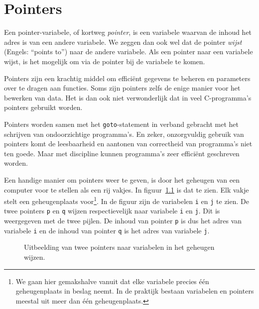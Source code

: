 \chapter{Pointers}
\label{cha:pointers}
\thispagestyle{empty}

Een pointer-variabele, of kortweg \textsl{pointer}, is een variabele waarvan de inhoud het adres is van een andere variabele. We zeggen dan ook wel dat de pointer \textsl{wijst} (Engels: ``points to'') naar de andere variabele. Als een pointer naar een variabele wijst, is het mogelijk om via de pointer bij de variabele te komen.

Pointers zijn een krachtig middel om efficiënt gegevens te beheren en parameters over te dragen aan functies. Soms zijn pointers zelfs de enige manier voor het bewerken van data. Het is dan ook niet verwonderlijk dat in veel C-programma's pointers gebruikt worden. 

Pointers worden samen met het \texttt{goto}-statement in verband gebracht met het schrijven van ondoorzichtige programma's. En zeker, onzorgvuldig gebruik van pointers komt de leesbaarheid en aantonen van correctheid van programma's niet ten goede. Maar met discipline kunnen programma's zeer efficiënt geschreven worden.

Een handige manier om pointers weer te geven, is door het geheugen van een computer voor te stellen als een rij vakjes. In figuur~\ref{fig:poiinmem} is dat te zien. Elk vakje stelt een geheugenplaats voor\footnote{We gaan hier gemakshalve vanuit dat elke variabele precies één geheugenplaats in beslag neemt. In de praktijk bestaan variabelen en pointers meestal uit meer dan één geheugenplaats.}. In de figuur zijn de variabelen \texttt{i} en \texttt{j} te zien. De twee pointers \texttt{p} en \texttt{q} wijzen respectievelijk naar variabele \texttt{i} en \texttt{j}. Dit is weergegeven met de twee pijlen. De inhoud van pointer \texttt{p} is dus het adres van variabele \texttt{i} en de inhoud van pointer \texttt{q} is het adres van variabele \texttt{j}.

\vspace*{-0.5\baselineskip}
\begin{figure}[!ht]
\centering
{}
\caption{Uitbeelding van twee pointers naar variabelen in het geheugen wijzen.}
\label{fig:poiinmem}
\end{figure}


